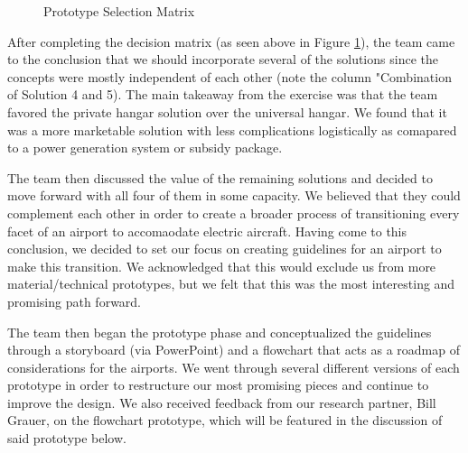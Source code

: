 \documentclass[../main.tex]{subfiles}
\begin{document}
\begin{figure}
\centering
{}
\caption{Prototype Selection Matrix}
\label{fig:selectionMatrix}
\end{figure}
\FloatBarrier

\newpage
After completing the decision matrix (as seen above in Figure \ref{fig:selectionMatrix}), the team came to the conclusion that we should incorporate several of the solutions since the concepts were mostly independent of each other (note the column "Combination of Solution 4 and 5). The main takeaway from the exercise was that the team favored the private hangar solution over the universal hangar. We found that it was a more marketable solution with less complications logistically as comapared to a power generation system or subsidy package.\par 
The team then discussed the value of the remaining solutions and decided to move forward with all four of them in some capacity. We believed that they could complement each other in order to create a broader process of transitioning every facet of an airport to accomaodate electric aircraft. Having come to this conclusion, we decided to set our focus on creating guidelines for an airport to make this transition. We acknowledged that this would exclude us from more material/technical prototypes, but we felt that this was the most interesting and promising path forward.\par
The team then began the prototype phase and conceptualized the guidelines through a storyboard (via PowerPoint) and a flowchart that acts as a roadmap of considerations for the airports. We went through several different versions of each prototype in order to restructure our most promising pieces and continue to improve the design. We also received feedback from our research partner, Bill Grauer, on the flowchart prototype, which will be featured in the discussion of said prototype below.\par
\end{document}
